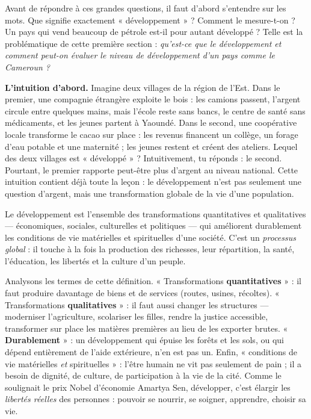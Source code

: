 \documentclass[11pt]{article}
\newcommand{\cle}[1]{{\popxbold\color{popdark}#1}}
\newcounter{popsec}
\newcounter{popsub}
\newcommand{\courssub}[1]{%
  \stepcounter{popsub}%
  \par\vspace{9pt}\noindent{\popxbold\fontsize{11.5}{13}\selectfont\color{popink}{\color{poporange}\thepopsec.\thepopsub}\hspace{6pt}#1}\par\nopagebreak\vspace{4pt}
}
\begin{document}
Avant de répondre à ces grandes questions, il faut d'abord s'entendre sur les mots. Que signifie exactement « développement » ? Comment le mesure-t-on ? Un pays qui vend beaucoup de pétrole est-il pour autant développé ? Telle est la problématique de cette première section : \emph{qu'est-ce que le développement et comment peut-on évaluer le niveau de développement d'un pays comme le Cameroun ?}

\courssub{Définir le développement}

\textbf{L'intuition d'abord.} Imagine deux villages de la région de l'Est. Dans le premier, une compagnie étrangère exploite le bois : les camions passent, l'argent circule entre quelques mains, mais l'école reste sans bancs, le centre de santé sans médicaments, et les jeunes partent à Yaoundé. Dans le second, une coopérative locale transforme le cacao sur place : les revenus financent un collège, un forage d'eau potable et une maternité ; les jeunes restent et créent des ateliers. Lequel des deux villages est « développé » ? Intuitivement, tu réponds : le second. Pourtant, le premier rapporte peut-être plus d'argent au niveau national. Cette intuition contient déjà toute la leçon : le développement n'est pas seulement une question d'argent, mais une transformation globale de la vie d'une population.

\begin{definition}[Le développement]
Le \cle{développement} est l'ensemble des transformations quantitatives et qualitatives — économiques, sociales, culturelles et politiques — qui améliorent durablement les conditions de vie matérielles et spirituelles d'une société. C'est un \emph{processus global} : il touche à la fois la production des richesses, leur répartition, la santé, l'éducation, les libertés et la culture d'un peuple.
\end{definition}

Analysons les termes de cette définition. « Transformations \textbf{quantitatives} » : il faut produire davantage de biens et de services (routes, usines, récoltes). « Transformations \textbf{qualitatives} » : il faut aussi changer les structures — moderniser l'agriculture, scolariser les filles, rendre la justice accessible, transformer sur place les matières premières au lieu de les exporter brutes. « \textbf{Durablement} » : un développement qui épuise les forêts et les sols, ou qui dépend entièrement de l'aide extérieure, n'en est pas un. Enfin, « conditions de vie matérielles \emph{et} spirituelles » : l'être humain ne vit pas seulement de pain ; il a besoin de dignité, de culture, de participation à la vie de la cité. Comme le soulignait le prix Nobel d'économie Amartya Sen, développer, c'est élargir les \emph{libertés réelles} des personnes : pouvoir se nourrir, se soigner, apprendre, choisir sa vie.
\end{document}
